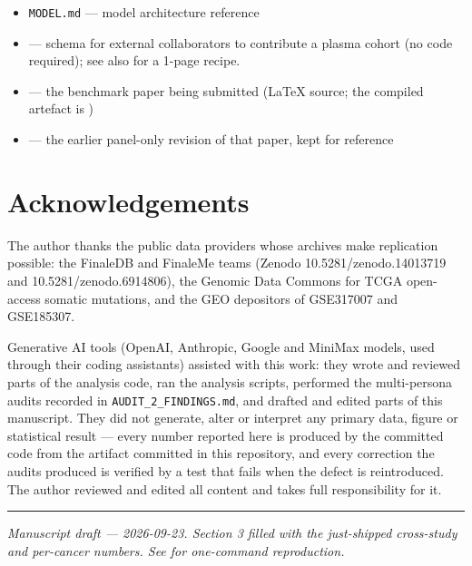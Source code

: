 \documentclass[11pt]{article}
\begin{document}
\begin{itemize}
\begin{itemize}
\item
\texttt{MODEL.md} --- model architecture reference
\item
{} --- schema for external collaborators to contribute a plasma cohort (no code required); see also  for a 1-page recipe.
\item
{} --- the benchmark paper being submitted (LaTeX source; the compiled artefact is )
\item
{} --- the earlier panel-only revision of that paper, kept for reference
\end{itemize}
\end{itemize}

\section{Acknowledgements}
The author thanks the public data providers whose archives make replication possible: the FinaleDB and FinaleMe teams (Zenodo 10.5281/zenodo.14013719 and 10.5281/zenodo.6914806), the Genomic Data Commons for TCGA open-access somatic mutations, and the GEO depositors of GSE317007 and GSE185307.

Generative AI tools (OpenAI, Anthropic, Google and MiniMax models, used through their coding assistants) assisted with this work: they wrote and reviewed parts of the analysis code, ran the analysis scripts, performed the multi-persona audits recorded in \texttt{AUDIT\_\allowbreak{}2\_\allowbreak{}FINDINGS.md}, and drafted and edited parts of this manuscript. They did not generate, alter or interpret any primary data, figure or statistical result --- every number reported here is produced by the committed code from the artifact committed in this repository, and every correction the audits produced is verified by a test that fails when the defect is reintroduced. The author reviewed and edited all content and takes full responsibility for it.

\par\bigskip\hrule\bigskip
\textit{Manuscript draft --- 2026-09-23. Section 3 filled with the just-shipped cross-study and per-cancer numbers. See  for one-command reproduction.}
\end{document}
